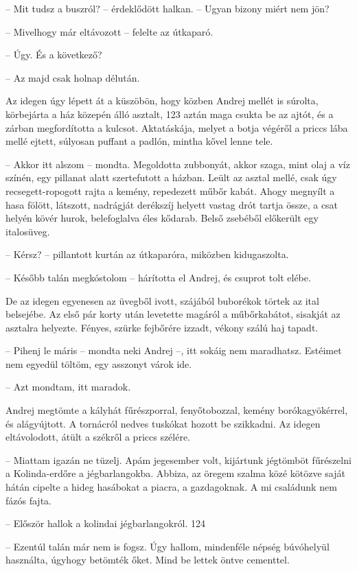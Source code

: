 \documentclass{IEEEtran}
\begin{document}
– Mit tudsz a buszról? – érdeklődött halkan. – Ugyan bizony miért nem jön?

– Mivelhogy már eltávozott – felelte az útkaparó.

– Úgy. És a következő?

– Az majd csak holnap délután.

Az idegen úgy lépett át a küszöbön, hogy közben Andrej mellét is súrolta,
körbejárta a ház közepén álló asztalt, 123 aztán maga csukta be az ajtót, és a
zárban megfordította a kulcsot. Aktatáskája, melyet a botja végéről a priccs
lába mellé ejtett, súlyosan puffant a padlón, mintha kővel lenne tele.

– Akkor itt alszom – mondta. Megoldotta zubbonyát, akkor szaga, mint olaj a
víz színén, egy pillanat alatt szertefutott a házban. Leült az asztal mellé,
csak úgy recsegett-ropogott rajta a kemény, repedezett műbőr kabát. Ahogy
megnyílt a hasa fölött, látszott, nadrágját derékszíj helyett vastag drót
tartja össze, a csat helyén kövér hurok, belefoglalva éles kődarab. Belső
zsebéből előkerült egy italosüveg.

– Kérsz? – pillantott kurtán az útkaparóra, miközben kidugaszolta.

– Később talán megkóstolom – hárította el Andrej, és csuprot tolt elébe.

De az idegen egyenesen az üvegből ivott, szájából buborékok törtek az ital
belsejébe. Az első pár korty után levetette magáról a műbőrkabátot, sisakját
az asztalra helyezte. Fényes, szürke fejbőrére izzadt, vékony szálú haj
tapadt.

– Pihenj le máris – mondta neki Andrej –, itt sokáig nem maradhatsz. Estéimet
nem egyedül töltöm, egy asszonyt várok ide.

– Azt mondtam, itt maradok.

Andrej megtömte a kályhát fűrészporral, fenyőtobozzal, kemény borókagyökérrel,
és alágyújtott. A tornácról nedves tuskókat hozott be szikkadni. Az idegen
eltávolodott, átült a székről a priccs szélére.

– Miattam igazán ne tüzelj. Apám jegesember volt, kijártunk jégtömböt
fűrészelni a Kolinda-erdőre a jégbarlangokba. Abbiza, az öregem szalma közé
kötözve saját hátán cipelte a hideg hasábokat a piacra, a gazdagoknak. A mi
családunk nem fázós fajta.

– Először hallok a kolindai jégbarlangokról.
124

– Ezentúl talán már nem is fogsz. Úgy hallom, mindenféle népség búvóhelyül
használta, úgyhogy betömték őket. Mind be lettek öntve cementtel.
\end{document}
